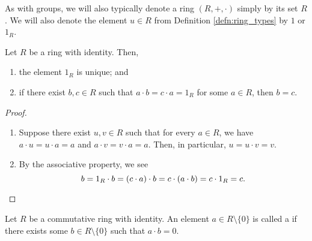 As with groups, we will also typically denote a ring $ (R,+,\cdot) $ simply by its set $ R $. We will also denote the element $ u\in R $ from Definition \ref{defn:ring_types} by $ 1 $ or $ 1_R $.

\begin{prop}
Let $ R $ be a ring with identity. Then,
\begin{enumerate}
    \item the element $ 1_R $ is unique; and
    \item if there exist $ b,c\in R $ such that $ a\cdot b=c\cdot a=1_R $ for some $ a\in R $, then $ b=c $.
\end{enumerate}
\end{prop}
\begin{proof}~
\begin{enumerate}
    \item Suppose there exist $ u,v\in R $ such that for every $ a\in R $, we have $ a\cdot u=u\cdot a=a $ and $ a\cdot v=v\cdot a=a $. Then, in particular, $ u=u\cdot v=v $.

    \item By the associative property, we see
    \begin{equation*}
        b=1_R\cdot b=(c\cdot a)\cdot b=c\cdot (a\cdot b)=c\cdot 1_R=c.\qedhere
    \end{equation*}
\end{enumerate}
\end{proof}

\begin{defn}
Let $ R $ be a commutative ring with identity. An element $ a\in R\setminus\{0\} $ is called a  if there exists some $ b\in R\setminus\{0\} $ such that $ a\cdot b=0 $.
\end{defn}

